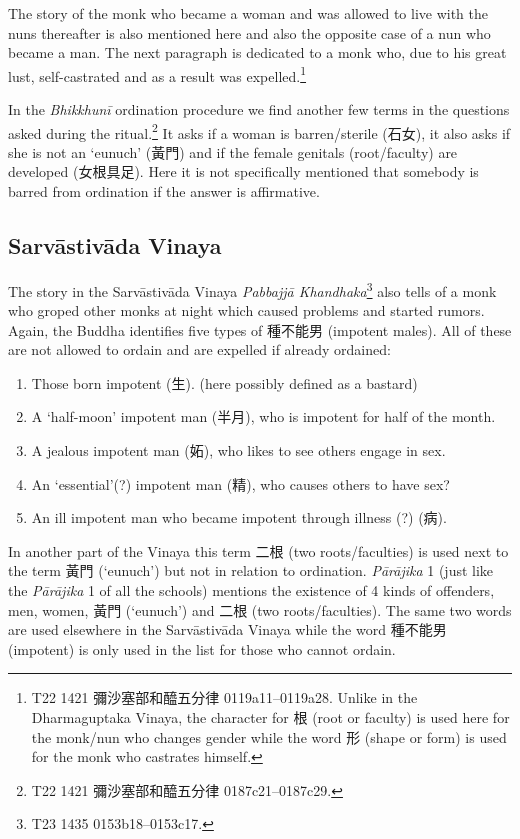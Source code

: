The story of the monk who became a woman and was allowed to live with the nuns thereafter is also mentioned here and also the opposite case of a nun who became a man. The next paragraph is dedicated to a monk who, due to his great lust, self-castrated and as a result was expelled.\footnote{T22 1421 彌沙塞部和醯五分律 0119a11–0119a28. Unlike in the Dharmaguptaka Vinaya, the character for 根 (root or faculty) is used here for the monk/nun who changes gender while the word 形 (shape or form) is used for the monk who castrates himself.} 

In the {\em Bhikkhunī} ordination procedure we find another few terms in the questions asked during the ritual.\footnote{T22 1421 彌沙塞部和醯五分律 0187c21–0187c29.} It asks if a woman is barren/sterile (石女), it also asks if she is not an `eunuch' (黃門) and if the female genitals (root/faculty) are developed (女根具足). Here it is not specifically mentioned that somebody is barred from ordination if the answer is affirmative.

\subsection{Sarvāstivāda Vinaya}
The story in the Sarvāstivāda Vinaya {\em Pabbajjā Khandhaka}\footnote{T23 1435 0153b18–0153c17.} also tells of a monk who groped other monks at night which caused problems and started rumors. Again, the Buddha identifies five types of 種不能男 (impotent males). All of these are not allowed to ordain and are expelled if already ordained:

\begin{enumerate}
\item Those born impotent (生). (here possibly defined as a bastard)
\item A `half-moon' impotent man (半月), who is impotent for half of the month.
\item A jealous impotent man (妬), who likes to see others engage in sex.
\item An `essential'(?) impotent man (精), who causes others to have sex?
\item An ill impotent man who became impotent through illness (?) (病).
\end{enumerate}

In another part of the Vinaya this term 二根 (two roots/faculties) is used next to the term 黃門 (`eunuch') but not in relation to ordination. {\em Pārājika} 1 (just like the {\em Pārājika} 1 of all the schools) mentions the existence of 4 kinds of offenders, men, women, 黃門 (`eunuch') and 二根 (two roots/faculties). The same two words are used elsewhere in the Sarvāstivāda Vinaya while the word 種不能男 (impotent) is only used in the list for those who cannot ordain.

